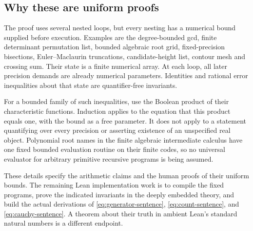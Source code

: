 \subsection{Why these are uniform proofs}
The proof uses several nested loops, but every nesting has a numerical
bound supplied before execution. Examples are the degree-bounded gcd,
finite determinant permutation list, bounded algebraic root grid,
fixed-precision bisections, Euler--Maclaurin truncations, candidate-height
list, contour mesh and crossing sum. Their state is a finite numerical
array. At each loop, all later precision demands are already numerical
parameters. Identities and rational error inequalities about that state
are quantifier-free invariants.

For a bounded family of such inequalities, use the Boolean product of
their characteristic functions. Induction applies to the equation that
this product equals one, with the bound as a free parameter. It does
not apply to a statement quantifying over every precision or asserting
existence of an unspecified real object. Polynomial root names in the
finite algebraic intermediate calculus have one fixed bounded
evaluation routine on their finite codes, so no universal evaluator for
arbitrary primitive recursive programs is being assumed.

These details specify the arithmetic claims and the human proofs of
their uniform bounds. The remaining Lean implementation work is to
compile the fixed programs, prove the indicated invariants in the deeply
embedded theory, and build the actual derivations of
\eqref{eq:generator-sentence}, \eqref{eq:count-sentence}, and
\eqref{eq:cauchy-sentence}. A theorem about their truth in ambient Lean's
standard natural numbers is a different endpoint.
